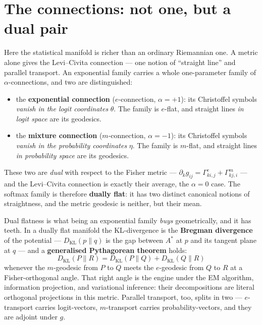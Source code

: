 \documentclass[11pt]{article}
\begin{document}
\section{The connections: not one, but a dual pair}

Here the statistical manifold is richer than an ordinary Riemannian one. A metric alone gives
the Levi--Civita connection --- one notion of ``straight line'' and parallel transport. An
exponential family carries a whole one-parameter family of $\alpha$-connections, and two are
distinguished:
\begin{itemize}[leftmargin=1.4em]
  \item the \textbf{exponential connection} ($e$-connection, $\alpha=+1$): its Christoffel
  symbols \emph{vanish in the logit coordinates} $\theta$. The family is $e$-flat, and straight
  lines \emph{in logit space} are its geodesics.
  \item the \textbf{mixture connection} ($m$-connection, $\alpha=-1$): its Christoffel symbols
  \emph{vanish in the probability coordinates} $\eta$. The family is $m$-flat, and straight
  lines \emph{in probability space} are its geodesics.
\end{itemize}
These two are \emph{dual} with respect to the Fisher metric --- $\partial_k g_{ij} =
\Gamma^{e}_{ki,j} + \Gamma^{m}_{kj,i}$ --- and the Levi--Civita connection is exactly their
average, the $\alpha=0$ case. The softmax family is therefore \textbf{dually flat}: it has two
distinct canonical notions of straightness, and the metric geodesic is neither, but their
mean.

\begin{insight}
Dual flatness is what being an exponential family \emph{buys} geometrically, and it has teeth.
In a dually flat manifold the KL-divergence is the \textbf{Bregman divergence} of the potential
--- $D_{\mathrm{KL}}(p\|q)$ is the gap between $A^{*}$ at $p$ and its tangent plane at $q$ ---
and a \textbf{generalised Pythagorean theorem} holds:
\[
  D_{\mathrm{KL}}(P\|R) = D_{\mathrm{KL}}(P\|Q) + D_{\mathrm{KL}}(Q\|R)
\]
whenever the $m$-geodesic from $P$ to $Q$ meets the $e$-geodesic from $Q$ to $R$ at a
Fisher-orthogonal angle. That right angle is the engine under the EM algorithm, information
projection, and variational inference: their decompositions are literal orthogonal projections
in this metric. Parallel transport, too, splits in two --- $e$-transport carries logit-vectors,
$m$-transport carries probability-vectors, and they are adjoint under $g$.
\end{insight}
\end{document}
